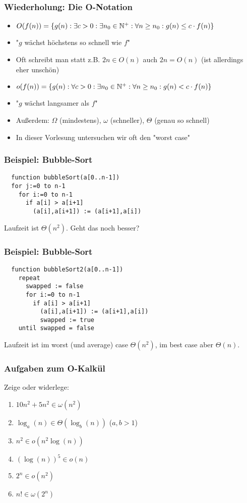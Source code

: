 \begin{frame}
\frametitle{Wiederholung: Die O-Notation}
\begin{itemize}
\item $O(f(n))=\{g(n):\exists c>0: \exists n_0\in\mathbb{N}^+: \forall n\geq n_0: g(n)\leq c\cdot f(n)\}$
\item "$g$ wächst höchstens so schnell wie $f$" \pause
\item Oft schreibt man statt z.B. $2n\in O(n)$ auch $2n=O(n)$ (ist allerdings eher unschön) \pause
\item $o(f(n))=\{g(n):\forall c>0: \exists n_0\in\mathbb{N}^+: \forall n\geq n_0: g(n)< c\cdot f(n)\}$
\item "$g$ wächst langsamer als $f$" \pause
\item Außerdem: $\Omega$ (mindestens), $\omega$ (schneller), $\Theta$ (genau so schnell) \pause
\item In dieser Vorlesung untersuchen wir oft den "worst case"
\end{itemize}
\end{frame}

\begin{frame}[fragile]
\frametitle{Beispiel: Bubble-Sort}
\begin{lstlisting}
  function bubbleSort(a[0..n-1])
  for j:=0 to n-1
    for i:=0 to n-1
      if a[i] > a[i+1]
        (a[i],a[i+1]) := (a[i+1],a[i]) 
\end{lstlisting}\pause
Laufzeit ist $\Theta(n^2)$. Geht das noch besser?
\end{frame}

\begin{frame}[fragile]
\frametitle{Beispiel: Bubble-Sort}
\begin{lstlisting}
  function bubbleSort2(a[0..n-1])
    repeat
      swapped := false
      for i:=0 to n-1
        if a[i] > a[i+1]
          (a[i],a[i+1]) := (a[i+1],a[i]) 
          swapped := true
    until swapped = false
\end{lstlisting}\pause
Laufzeit ist im worst (und average) case $\Theta(n^2)$, im best case aber $\Theta(n)$.
\end{frame}

\begin{frame}
\frametitle{Aufgaben zum O-Kalkül}
Zeige oder widerlege:
\begin{enumerate}
\item $10n^2 + 5n^2 \in \omega(n^2)$
\item $\log_a(n)\in\Theta(\log_b(n))$ ($a,b>1$)
\item $n^2 \in o(n^2 \log(n))$
\item $(\log(n))^5 \in o(n)$
\item $2^n \in o(n^2)$
\item $n! \in \omega(2^n)$
\end{enumerate}
\end{frame}

